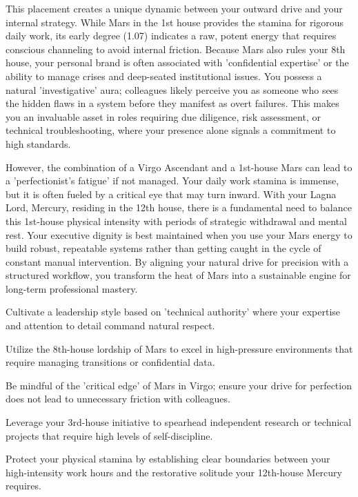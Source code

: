 {\fontsize{9}{13}\selectfont This placement creates a unique dynamic between your outward drive and your internal strategy. While Mars in the 1st house provides the stamina for rigorous daily work, its early degree (1.07\textdegree{}) indicates a raw, potent energy that requires conscious channeling to avoid internal friction. Because Mars also rules your 8th house, your personal brand is often associated with 'confidential expertise' or the ability to manage crises and deep-seated institutional issues. You possess a natural 'investigative' aura; colleagues likely perceive you as someone who sees the hidden flaws in a system before they manifest as overt failures. This makes you an invaluable asset in roles requiring due diligence, risk assessment, or technical troubleshooting, where your presence alone signals a commitment to high standards.}\par\vspace{1.8mm}

{\fontsize{9}{13}\selectfont However, the combination of a Virgo Ascendant and a 1st-house Mars can lead to a 'perfectionist's fatigue' if not managed. Your daily work stamina is immense, but it is often fueled by a critical eye that may turn inward. With your Lagna Lord, Mercury, residing in the 12th house, there is a fundamental need to balance this 1st-house physical intensity with periods of strategic withdrawal and mental rest. Your executive dignity is best maintained when you use your Mars energy to build robust, repeatable systems rather than getting caught in the cycle of constant manual intervention. By aligning your natural drive for precision with a structured workflow, you transform the heat of Mars into a sustainable engine for long-term professional mastery.}\par\vspace{1.8mm}

\begin{diamondlist}
  \item {\fontsize{8.5}{12}\selectfont Cultivate a leadership style based on 'technical authority' where your expertise and attention to detail command natural respect.}
  \item {\fontsize{8.5}{12}\selectfont Utilize the 8th-house lordship of Mars to excel in high-pressure environments that require managing transitions or confidential data.}
  \item {\fontsize{8.5}{12}\selectfont Be mindful of the 'critical edge' of Mars in Virgo; ensure your drive for perfection does not lead to unnecessary friction with colleagues.}
  \item {\fontsize{8.5}{12}\selectfont Leverage your 3rd-house initiative to spearhead independent research or technical projects that require high levels of self-discipline.}
  \item {\fontsize{8.5}{12}\selectfont Protect your physical stamina by establishing clear boundaries between your high-intensity work hours and the restorative solitude your 12th-house Mercury requires.}
\end{diamondlist}

